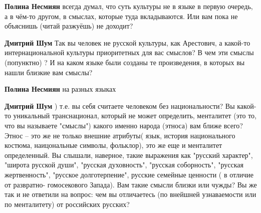 \begin{itemize}
\begin{itemize}
\textbf{Полина Несмиян} всегда думал, что суть культуры не в языке в первую
очередь, а в чём-то другом, в смыслах, которые туда вкладываются. Или вам пока
не объяснишь (читай разжуёшь) не доходит?

 
\textbf{Дмитрий Шум} Так вы человек не русской культуры, как Арестович, а
какой-то интернациональной культуры приоритетных для вас смыслов? В чем эти
смыслы (попунктно) ? И на каком языке были созданы те произведения, в которых
вы нашли близкие вам смыслы?

 
\textbf{Полина Несмиян} на разных языках

 
\textbf{Дмитрий Шум} ) т.е. вы себя считаете человеком без национальности? Вы
какой-то уникальный транснационал, который не может определить, менталитет (это
то, что вы называете "смыслы") какого именно народа (этноса) вам ближе
всего?Этнос – это же не только внешние атрибуты( язык, история национального
костюма, наицональные символы, фольклор), это же еще и менталитет определенный.
Вы слышали, наверное, такие выражения как "русский характер", "широта русской
души", "русская духовность", "русская соборность", "русская жертвенность",
"русское долготерпение", русские семейные ценности ( в отличие от развратно-
гомосекового Запада). Вам такие смысли близки или чужды?  Вы же так и не
ответили на вопрос: чем вы отличаетесь (по внейшней узнаваемости или по
менталитету) от российских русских?

 

\end{itemize}
\end{itemize}
